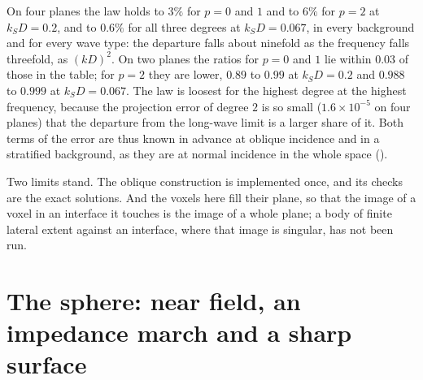 \documentclass[11pt,a4paper]{article}
\begin{document}
On four planes the law holds to $3\%$ for $p=0$ and $1$ and to $6\%$ for $p=2$ at $k_SD=0.2$, and to
$0.6\%$ for all three degrees at $k_SD=0.067$, in every background and for every wave type: the
departure falls about ninefold as the frequency falls threefold, as $(kD)^2$. On two planes the ratios
for $p=0$ and $1$ lie within $0.03$ of those in the table; for $p=2$ they are lower, $0.89$ to $0.99$ at
$k_SD=0.2$ and $0.988$ to $0.999$ at $k_SD=0.067$. The law is loosest for the highest degree at the
highest frequency, because the projection error of degree $2$ is so small ($1.6\times10^{-5}$ on four
planes) that the departure from the long-wave limit is a larger share of it. Both terms of
the error are thus known in advance at oblique incidence and in a stratified background, as they are
at normal incidence in the whole space ().

Two limits stand. The oblique construction is implemented once, and its checks are the exact
solutions. And the voxels here fill their plane, so that the image of a voxel in an interface it
touches is the image of a whole plane; a body of finite lateral extent against an interface, where
that image is singular, has not been run.

\FloatBarrier

\section{The sphere: near field, an impedance march and a sharp surface}\label{app:sphere}
\end{document}

